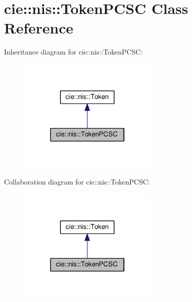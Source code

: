 \hypertarget{classcie_1_1nis_1_1TokenPCSC}{\section{cie\-:\-:nis\-:\-:Token\-P\-C\-S\-C Class Reference}
\label{classcie_1_1nis_1_1TokenPCSC}
}


Inheritance diagram for cie\-:\-:nis\-:\-:Token\-P\-C\-S\-C\-:
\nopagebreak
\begin{figure}[H]
\begin{center}
\leavevmode
\includegraphics[width=190pt]{classcie_1_1nis_1_1TokenPCSC__inherit__graph}
\end{center}
\end{figure}


Collaboration diagram for cie\-:\-:nis\-:\-:Token\-P\-C\-S\-C\-:
\nopagebreak
\begin{figure}[H]
\begin{center}
\leavevmode
\includegraphics[width=190pt]{classcie_1_1nis_1_1TokenPCSC__coll__graph}
\end{center}
\end{figure}
